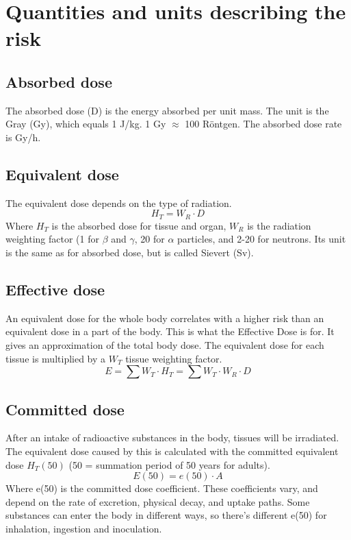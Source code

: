 \section{Quantities and units describing the risk}
\subsection{Absorbed dose}
The absorbed dose (D) is the energy absorbed per unit mass. The unit is the Gray (Gy), which equals 1 J/kg. 1 Gy $\approx$ 100 Röntgen. The absorbed dose rate is Gy/h.

\subsection{Equivalent dose}
The equivalent dose depends on the type of radiation. 
\[H_T=W_R\cdot D\]
Where $H_T$ is the absorbed dose for tissue and organ, $W_R$ is the radiation weighting factor (1 for $\beta$ and $\gamma$, 20 for $\alpha$ particles, and 2-20 for neutrons. Its unit is the same as for absorbed dose, but is called Sievert (Sv).

\subsection{Effective dose}
An equivalent dose for the whole body correlates with a higher risk than an equivalent dose in a part of the body. This is what the Effective Dose is for. It gives an approximation of the total body dose. The equivalent dose for each tissue is multiplied by a $W_T$ tissue weighting factor.
\[E=\sum W_T \cdot H_T = \sum W_T \cdot W_R \cdot D\]

\subsection{Committed dose}
After an intake of radioactive substances in the body, tissues will be irradiated. The equivalent dose caused by this is calculated with the committed equivalent dose $H_T(50)$ (50 = summation period of 50 years for adults).
\[E(50) = e(50)\cdot A\]
Where e(50) is the committed dose coefficient. These coefficients vary, and depend on the rate of excretion, physical decay, and uptake paths. Some substances can enter the body in different ways, so there's different e(50) for inhalation, ingestion and inoculation.

